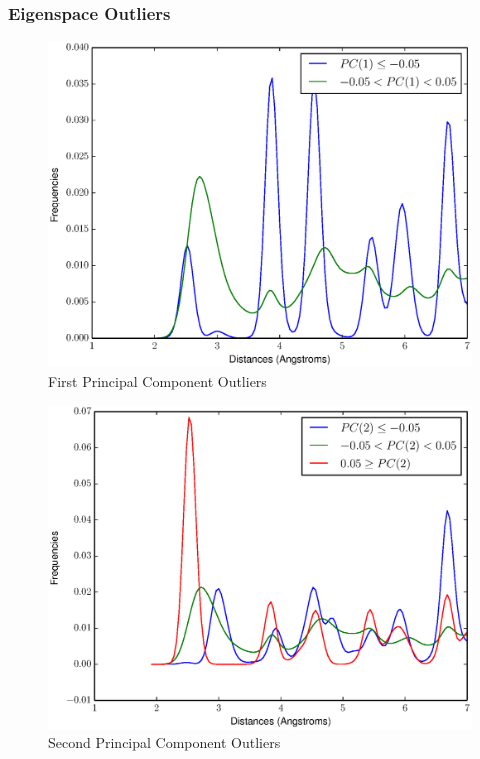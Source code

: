 \documentclass[12pt,letterpaper]{article}
\begin{document}
\subsubsection{Eigenspace Outliers}
\begin{figure}[ht]
  \begin{center}
    \includegraphics[scale=0.8]{figs/eigenOutlier1.eps}
    \caption{First Principal Component Outliers}
  \end{center}
\end{figure}

\begin{figure}[ht]
  \begin{center}
    \includegraphics[scale=0.8]{figs/eigenOutlier2.eps}
    \caption{Second Principal Component Outliers}
  \end{center}
\end{figure}
\end{document}
